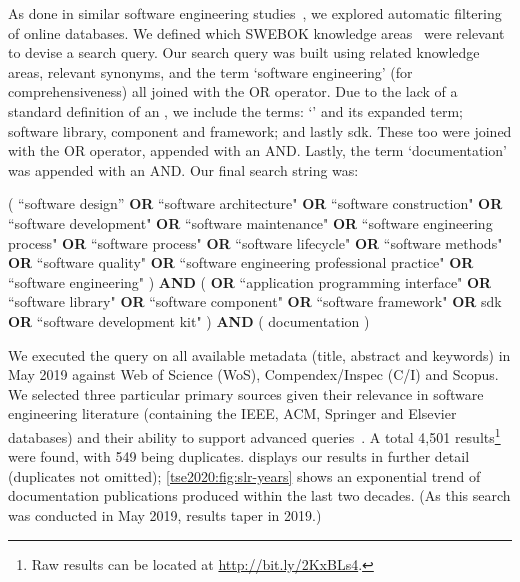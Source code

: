 As done in similar software engineering studies~\citep{Glass:2002wa,Usman:2017hn,GAROUSI2019101}, we explored  automatic filtering of online databases. We defined which SWEBOK  knowledge areas~\citep{IEEE:1990wp} were relevant to devise a search query. Our search query was built using related knowledge areas, relevant synonyms, and the term `software engineering' (for comprehensiveness) all joined with the OR operator. Due to the lack of a standard definition of an , we include the terms: `' and its expanded term; software library, component and framework; and lastly \gls{sdk}. These too were joined with the OR operator, appended with an AND. Lastly, the term `documentation' was appended with an AND.
Our final search string was:
\begin{framed}
\noindent
\parbox{\linewidth}{
\scriptsize
( ``software design'' \textbf{OR} ``software architecture" \textbf{OR} ``software construction" \textbf{OR} ``software development" \textbf{OR} ``software maintenance" \textbf{OR} ``software engineering process" \textbf{OR} ``software process" \textbf{OR} ``software lifecycle" \textbf{OR} ``software methods" \textbf{OR} ``software quality" \textbf{OR} ``software engineering professional practice" \textbf{OR} ``software engineering" ) \textbf{AND} (  \textbf{OR} ``application programming interface" \textbf{OR} ``software library" \textbf{OR} ``software component" \textbf{OR} ``software framework" \textbf{OR} sdk \textbf{OR} ``software development kit" ) \textbf{AND} ( documentation )
}
\end{framed}

We executed the query on all available metadata (title, abstract and keywords) in May 2019 against Web of Science  (WoS), Compendex/Inspec (C/I) and Scopus. We selected three particular primary sources given their relevance in software engineering literature (containing the IEEE, ACM, Springer and Elsevier databases) and their ability to support advanced queries~\citep{Brereton:2007by,Kitchenham:2007dd}. A total 4,501 results\footnote{Raw results can be located at \url{http://bit.ly/2KxBLs4}.} were found, with 549 being duplicates.  displays our results in further detail (duplicates not omitted); \cref{tse2020:fig:slr-years} shows an exponential trend of  documentation publications produced within the last two decades. (As this search was conducted in May 2019, results taper in 2019.)

